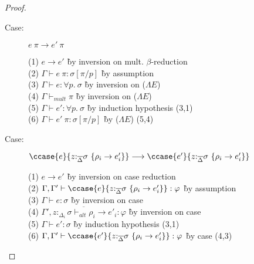 \begin{proof}
\begin{description}
\item[Case:] $e~\pi \longrightarrow e'~\pi$
\begin{tabbing}
(1) $e \longrightarrow e'$ \` by inversion on mult. $\beta$-reduction \\
(2) $\Gamma \vdash e~\pi : \sigma[\pi/p]$ \` by assumption \\
(3) $\Gamma \vdash e : \forall p.~\sigma$ \` by inversion on ($\Lambda E$) \\
(4) $\Gamma \vdash_{mult} \pi$ \` by inversion on ($\Lambda E$) \\
(5) $\Gamma \vdash e' : \forall p.~\sigma$ \` by induction hypothesis (3,1) \\
(6) $\Gamma \vdash e'~\pi : \sigma[\pi/p]$ \` by ($\Lambda E$) (5,4) \\
\end{tabbing}

\item[Case:] $\ccase{e}{z{:}_{\overline{\Delta}}\sigma~\{\rho_i\to e'_i\}} \longrightarrow \ccase{e'}{z{:}_{\overline{\Delta}}\sigma~\{\rho_i\to e'_i\}}$
\begin{tabbing}
(1) $e \longrightarrow e'$ \` by inversion on case reduction \\
(2) $\Gamma, \Gamma' \vdash \ccase{e}{z{:}_{\overline{\Delta}}\sigma~\{\rho_i\to e'_i\}} : \varphi$ \` by assumption \\
(3) $\Gamma \vdash e : \sigma$ \` by inversion on case \\
(4) $\overline{\Gamma', z{:}_{\Delta_i}\sigma \vdash_{alt} \rho_i \to e'_i : \varphi}$ \` by inversion on case \\
(5) $\Gamma \vdash e' : \sigma$ \` by induction hypothesis (3,1) \\
(6) $\Gamma, \Gamma' \vdash \ccase{e'}{z{:}_{\overline{\Delta}}\sigma~\{\rho_i\to e'_i\}} : \varphi$ \` by case (4,3) \\
\end{tabbing}

\end{description}

\end{proof}

